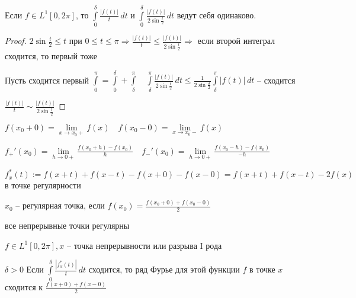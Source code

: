 \begin{lemma}\thmslashn
	
	Если $f\in L^1[0, 2\pi]$, то $\int\limits_{0}^{\delta} \frac{|f(t)|}{t}\,dt$ и $\int\limits_{0}^{\delta} \frac{|f(t)|}{2\sin \frac{t}{2}}\,dt$ ведут себя одинаково.
	
\end{lemma}

\begin{proof}\thmslashn

	$2\sin \frac{t}{2} \leqslant t$ при $0 \leqslant t \leqslant \pi \Rightarrow \frac{|f(t)|}{t} \leqslant \frac{|f(t)|}{2\sin \frac{t}{2}} \Rightarrow$ если второй интеграл сходится, то первый тоже
	
	Пусть сходится первый $\int\limits_{0}^\pi = \int\limits_{0}^\delta + \int\limits_\delta^\pi \quad \int\limits_{\delta}^\pi \frac{|f(t)|}{2\sin \frac{t}{2}}\,dt \leqslant \frac{1}{2\sin \frac{\delta}{2}} \int\limits_{\delta}^\pi |f(t)|\,dt$ -- сходится
	
	$\frac{|f(t)|}{t} \sim \frac{|f(t)|}{2\sin\frac{t}{2}}$

\end{proof}

\begin{definition}\thmslashn
	
	$f(x_0 + 0) = \lim\limits_{x\to x_{0}+} f(x) \quad f(x_0 - 0) = \lim\limits_{x \to x_0 -} f(x)$
	
	$f_+'(x_0) = \lim\limits_{h \to 0+} \frac{f(x_0 + h) - f(x_0)}{h} \quad f_-'(x_0) = \lim\limits_{h \to 0+}\frac{f(x_0 - h) - f(x_0)}{-h}$
	
	$f_x^*(t) := f(x + t) + f(x - t) - f(x + 0) - f(x - 0) = f(x + t) + f(x - t) - 2f(x)$ в точке регулярности
	
\end{definition}

\begin{definition}\thmslashn
	
	$x_0$ -- регулярная точка, если $f(x_0) = \frac{f(x_0 + 0) + f(x_0 - 0)}{2}$
	
	все непрерывные точки регулярны
	
\end{definition}

\begin{theorem}\thmslashn 

	$f \in L^1[0, 2\pi], x$ -- точка непрерывности или разрыва I рода
	
	$\delta > 0$ Если $\int\limits_{0}^{\delta} \frac{|f^*_{\alpha} (t)|}{t}\,dt$ сходится, то ряд Фурье для этой функции $f$ в точке $x$ сходится к $\frac{f(x+ 0) + f(x - 0)}{2}$

\end{theorem}

